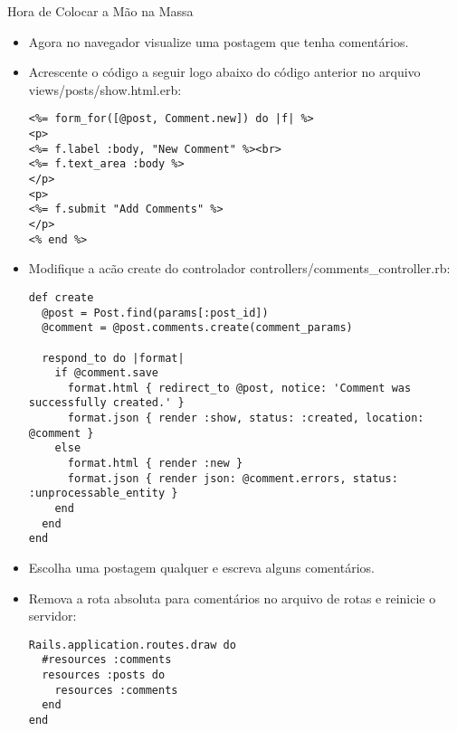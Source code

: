 \begin{frame}{Hora de Colocar a Mão na Massa}
\begin{itemize}
	\item Agora no navegador visualize uma postagem que tenha comentários.
	\item Acrescente o código a seguir logo abaixo do código anterior no arquivo \alert{views/posts/show.html.erb}:
	\begin{lstlisting}[style=RubyInputStyle]
<%= form_for([@post, Comment.new]) do |f| %>
<p>
<%= f.label :body, "New Comment" %><br>
<%= f.text_area :body %>
</p>
<p>
<%= f.submit "Add Comments" %>
</p>
<% end %>
\end{lstlisting}

\item Modifique a acão create do controlador \alert{controllers/comments\_controller.rb}:
\begin{lstlisting}[style=RubyInputStyle]
def create
  @post = Post.find(params[:post_id])
  @comment = @post.comments.create(comment_params)

  respond_to do |format|
    if @comment.save
      format.html { redirect_to @post, notice: 'Comment was successfully created.' }
      format.json { render :show, status: :created, location: @comment }
    else
      format.html { render :new }
      format.json { render json: @comment.errors, status: :unprocessable_entity }
    end
  end
end 
\end{lstlisting}

\item Escolha uma postagem qualquer e escreva alguns comentários.

\item Remova a rota absoluta para comentários no arquivo de rotas e reinicie o servidor:
\begin{lstlisting}[style=RubyInputStyle, caption=config/routes.rb]
Rails.application.routes.draw do
  #resources :comments
  resources :posts do 
    resources :comments
  end 
end 
\end{lstlisting}	
	\end{itemize}
\end{frame}
